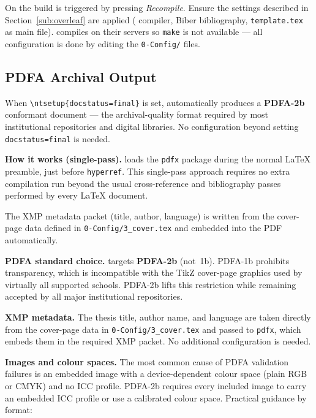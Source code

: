 On \Overleaf{} the build is triggered by pressing \emph{Recompile}.
Ensure the settings described in Section~\ref{sub:overleaf} are applied
( compiler, Biber bibliography, \verb!template.tex! as main file).
\Overleaf{} compiles on their servers so \texttt{make} is not available —
all configuration is done by editing the \verb!0-Config/! files.
\subsection{\texorpdfstring{\gls{PDFA}}{PDF/A} Archival Output}
\label{sub:pdfa}

When \verb!\ntsetup{docstatus=final}! is set, \novathesis{} automatically
produces a \textbf{\gls{PDFA}-2b} conformant document — the archival-quality
format required by most institutional repositories and digital libraries.
No configuration beyond setting \texttt{docstatus=final} is needed.

\medskip
\noindent\textbf{How it works (single-pass).}
\novathesis{} loads the \texttt{pdfx} package during the normal \LaTeX{}
preamble, just before \texttt{hyperref}.  This single-pass approach requires
no extra compilation run beyond the usual cross-reference and bibliography
passes performed by every \LaTeX{} document.

The XMP metadata packet (title, author, language) is written from the
cover-page data defined in \verb!0-Config/3_cover.tex! and embedded into
the PDF automatically.

\medskip
\noindent\textbf{\gls{PDFA} standard choice.}
\novathesis{} targets \textbf{\gls{PDFA}-2b} (not~1b).  \gls{PDFA}-1b prohibits
transparency, which is incompatible with the TikZ cover-page graphics used
by virtually all supported schools.  \gls{PDFA}-2b lifts this restriction while
remaining accepted by all major institutional repositories.

\medskip
\noindent\textbf{XMP metadata.}
The thesis title, author name, and language are taken directly from the
cover-page data in \verb!0-Config/3_cover.tex! and passed to \texttt{pdfx},
which embeds them in the required XMP packet.  No additional configuration
is needed.

\medskip
\noindent\textbf{Images and colour spaces.}
The most common cause of \gls{PDFA} validation failures is an embedded image
with a device-dependent colour space (plain RGB or CMYK) and no ICC
profile.  \gls{PDFA}-2b requires every included image to carry an embedded
ICC profile or use a calibrated colour space.  Practical guidance by
format:

